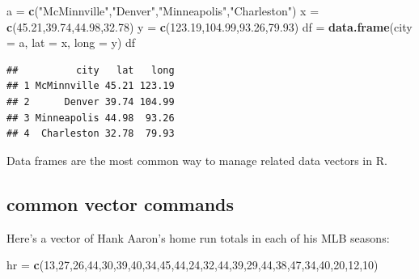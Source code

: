 \documentclass[
]{book}
\newenvironment{Shaded}{\begin{snugshade}}{\end{snugshade}}
\newcommand{\AttributeTok}[1]{\textcolor[rgb]{0.13,0.29,0.53}{#1}}
\newcommand{\DecValTok}[1]{\textcolor[rgb]{0.00,0.00,0.81}{#1}}
\newcommand{\FloatTok}[1]{\textcolor[rgb]{0.00,0.00,0.81}{#1}}
\newcommand{\FunctionTok}[1]{\textcolor[rgb]{0.13,0.29,0.53}{\textbf{#1}}}
\newcommand{\NormalTok}[1]{#1}
\newcommand{\OtherTok}[1]{\textcolor[rgb]{0.56,0.35,0.01}{#1}}
\newcommand{\StringTok}[1]{\textcolor[rgb]{0.31,0.60,0.02}{#1}}
\theoremstyle{definition}
\theoremstyle{definition}
\theoremstyle{definition}
\theoremstyle{definition}
\theoremstyle{remark}
\begin{document}
\begin{Shaded}
\begin{Highlighting}[]
\NormalTok{a }\OtherTok{=} \FunctionTok{c}\NormalTok{(}\StringTok{"McMinnville"}\NormalTok{,}\StringTok{"Denver"}\NormalTok{,}\StringTok{"Minneapolis"}\NormalTok{,}\StringTok{"Charleston"}\NormalTok{)}
\NormalTok{x }\OtherTok{=} \FunctionTok{c}\NormalTok{(}\FloatTok{45.21}\NormalTok{,}\FloatTok{39.74}\NormalTok{,}\FloatTok{44.98}\NormalTok{,}\FloatTok{32.78}\NormalTok{)}
\NormalTok{y }\OtherTok{=} \FunctionTok{c}\NormalTok{(}\FloatTok{123.19}\NormalTok{,}\FloatTok{104.99}\NormalTok{,}\FloatTok{93.26}\NormalTok{,}\FloatTok{79.93}\NormalTok{)}
\NormalTok{df }\OtherTok{=} \FunctionTok{data.frame}\NormalTok{(}\AttributeTok{city =}\NormalTok{ a, }\AttributeTok{lat =}\NormalTok{ x, }\AttributeTok{long =}\NormalTok{ y)}
\NormalTok{df}
\end{Highlighting}
\end{Shaded}

\begin{verbatim}
##          city   lat   long
## 1 McMinnville 45.21 123.19
## 2      Denver 39.74 104.99
## 3 Minneapolis 44.98  93.26
## 4  Charleston 32.78  79.93
\end{verbatim}

Data frames are the most common way to manage related data vectors in R.

\subsection{common vector commands}\label{common-vector-commands}

Here's a vector of Hank Aaron's home run totals in each of his MLB seasons:

\begin{Shaded}
\begin{Highlighting}[]
\NormalTok{hr }\OtherTok{=} \FunctionTok{c}\NormalTok{(}\DecValTok{13}\NormalTok{,}\DecValTok{27}\NormalTok{,}\DecValTok{26}\NormalTok{,}\DecValTok{44}\NormalTok{,}\DecValTok{30}\NormalTok{,}\DecValTok{39}\NormalTok{,}\DecValTok{40}\NormalTok{,}\DecValTok{34}\NormalTok{,}\DecValTok{45}\NormalTok{,}\DecValTok{44}\NormalTok{,}\DecValTok{24}\NormalTok{,}\DecValTok{32}\NormalTok{,}\DecValTok{44}\NormalTok{,}\DecValTok{39}\NormalTok{,}\DecValTok{29}\NormalTok{,}\DecValTok{44}\NormalTok{,}\DecValTok{38}\NormalTok{,}\DecValTok{47}\NormalTok{,}\DecValTok{34}\NormalTok{,}\DecValTok{40}\NormalTok{,}\DecValTok{20}\NormalTok{,}\DecValTok{12}\NormalTok{,}\DecValTok{10}\NormalTok{)}
\end{Highlighting}
\end{Shaded}
\end{document}
